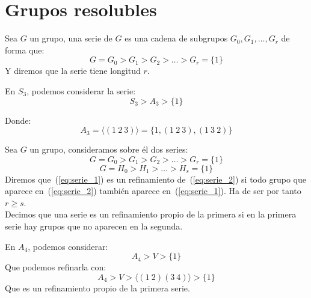 \chapter{Grupos resolubles} %
\begin{definicion}
    Sea $G$ un grupo, una serie de $G$ es una cadena de subgrupos $G_0,G_1,\ldots, G_r$ de forma que:
    \begin{equation*}
        G = G_0 > G_1 > G_2 > \ldots > G_r = \{1\}
    \end{equation*}
    Y diremos que la serie tiene longitud $r$.
\end{definicion}

\begin{ejemplo}
    En $S_3$, podemos considerar la serie:
    \begin{equation*}
        S_3 > A_3 > \{1\}
    \end{equation*}

    Donde:
    \begin{equation*}
        A_3 = \langle (1\ 2\ 3) \rangle  = \{1, (1\ 2\ 3), (1\ 3\ 2)\}
    \end{equation*}
\end{ejemplo}

\begin{definicion}[Refinamiento]
    Sea $G$ un grupo, consideramos sobre él dos series:
    \begin{equation}\label{eq:serie_1}
        G = G_0 > G_1 > G_2 > \ldots > G_r = \{1\}
    \end{equation}
    \begin{equation}\label{eq:serie_2}
        G = H_0 > H_1 > \ldots > H_s = \{1\}
    \end{equation}
    Diremos que~(\ref{eq:serie_1}) es un refinamiento de~(\ref{eq:serie_2}) si todo grupo que aparece en~(\ref{eq:serie_2}) también aparece en~(\ref{eq:serie_1}). Ha de ser por tanto $r\geq s$.\\

    \noindent
    Decimos que una serie es un refinamiento propio de la primera si en la primera serie hay grupos que no aparecen en la segunda.
\end{definicion}

\begin{ejemplo}
    En $A_4$, podemos considerar:
    \begin{equation*}
        A_4 > V > \{1\}
    \end{equation*}
    Que podemos refinarla con:
    \begin{equation*}
        A_4 > V > \langle (1\ 2)(3\ 4) \rangle > \{1\}
    \end{equation*}
    Que es un refinamiento propio de la primera serie.
\end{ejemplo}

